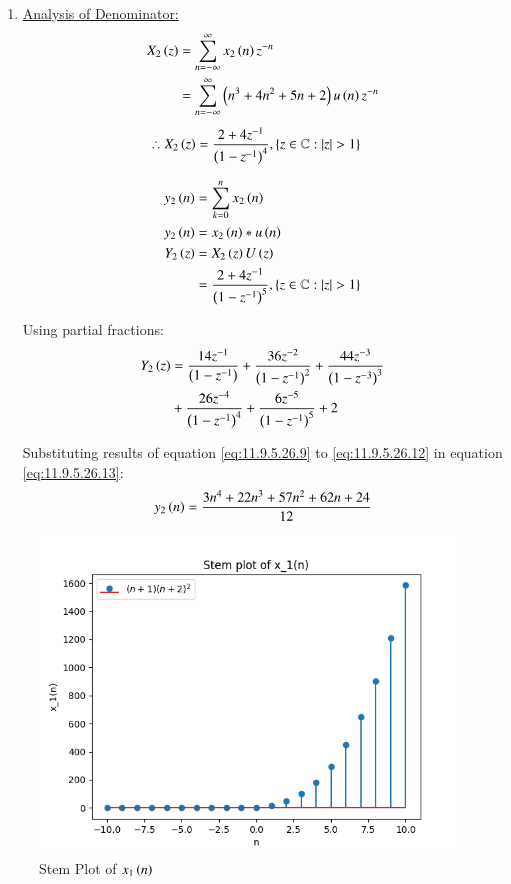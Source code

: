 \documentclass[journal,12pt,twocolumn]{IEEEtran}
\theoremstyle{remark}
\begin{document}
\begin{enumerate}[label=\arabic*.]
\item \underline{Analysis of Denominator:}
\begin{align}
    X_2\left(z\right) &= \sum_{n=-\infty}^\infty x_2\left(n\right) z^{-n}\\
                &= \sum_{n=-\infty}^\infty \left(n^{3}+4n^{2}+5n+2\right) u\left(n\right) z^{-n}
\end{align}
\begin{align}
   \therefore  X_2\left(z\right) &= \frac{2+4z^{-1}}{\left(1-z^{-1}\right)^4},\left\{z\in\mathbb{C} : \lvert z \rvert > 1\right\}   
\end{align}

\begin{align}
    y_2\left(n\right) &= \sum_{k=0}^n x_2\left(n\right)\\
    y_2\left(n\right) &= x_2\left(n\right)\ast u\left(n\right)\\
    Y_2\left(z\right) &= X_2\left(z\right) U\left(z\right) \\
 &=\frac{2+4z^{-1}}{\left(1-z^{-1}\right)^5} ,\left\{z\in\mathbb{C} : \lvert z \rvert > 1\right\} 
\end{align}

Using partial fractions:
\begin{align}
    Y_2\left(z\right) &= \frac{14z^{-1}}{\left(1-z^{-1}\right)} + \frac{36z^{-2}}{\left(1-z^{-1}\right)^2} + \frac{44z^{-3}}{\left(1-z^{-3}\right)^3} \label{eq:11.9.5.26.13}\\
    &+ \frac{26z^{-4}}{\left(1-z^{-1}\right)^4}+\frac{6z^{-5}}{\left(1-z^{-1}\right)^5}+2\notag 
\end{align}

Substituting results of equation \eqref{eq:11.9.5.26.9} to \eqref{eq:11.9.5.26.12} in equation \eqref{eq:11.9.5.26.13}:
\begin{align}
    y_2\left(n\right) =  \frac{3n^4 + 22n^3 + 57n^2 + 62n + 24}{12}
\end{align}
\end{enumerate}

\begin{figure}[htbp]
    \centering
    \includegraphics[width=1\columnwidth]{figs/x1_plot.png}
    \caption{Stem Plot of $x_1\left(n\right)$}
    \label{fig:x1}
\end{figure}
\end{document}
